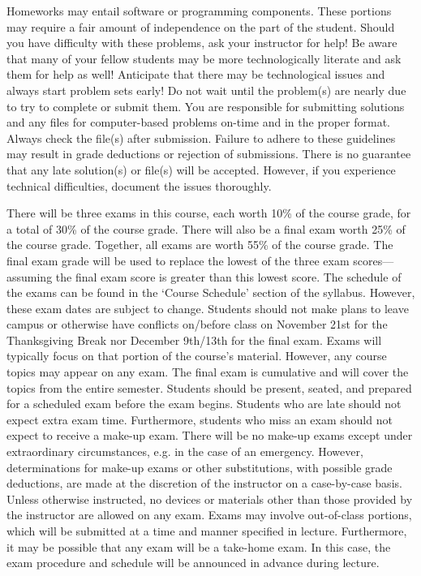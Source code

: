 \documentclass[11pt,letterpaper]{article}
\begin{document}
Homeworks may entail software or programming components. These portions may require a fair amount of independence on the part of the student. Should you have difficulty with these problems, ask your instructor for help! Be aware that many of your fellow students may be more technologically literate and ask them for help as well! Anticipate that there may be technological issues and always start problem sets early! Do not wait until the problem(s) are nearly due to try to complete or submit them. You are responsible for submitting solutions and any files for computer-based problems on-time and in the proper format. Always check the file(s) after submission. Failure to adhere to these guidelines may result in grade deductions or rejection of submissions. There is no guarantee that any late solution(s) or file(s) will be accepted. However, if you experience technical difficulties, document the issues thoroughly. 
\sectionbreak




There will be three exams in this course, each worth 10\% of the course grade, for a total of 30\% of the course grade. There will also be a final exam worth 25\% of the course grade. Together, all exams are worth 55\% of the course grade. The final exam grade will be used to replace the lowest of the three exam scores---assuming the final exam score is greater than this lowest score. The schedule of the exams can be found in the `Course Schedule' section of the syllabus. However, these exam dates are subject to change. Students should not make plans to leave campus or otherwise have conflicts on/before class on November 21st for the Thanksgiving Break nor December 9th/13th for the final exam. Exams will typically focus on that portion of the course's material. However, any course topics may appear on any exam. The final exam is cumulative and will cover the topics from the entire semester. Students should be present, seated, and prepared for a scheduled exam before the exam begins. Students who are late should not expect extra exam time. Furthermore, students who miss an exam should not expect to receive a make-up exam. There will be no make-up exams except under extraordinary circumstances, e.g. in the case of an emergency. However, determinations for make-up exams or other substitutions, with possible grade deductions, are made at the discretion of the instructor on a case-by-case basis. Unless otherwise instructed, no devices or materials other than those provided by the instructor are allowed on any exam. Exams may involve out-of-class portions, which will be submitted at a time and manner specified in lecture. Furthermore, it may be possible that any exam will be a take-home exam. In this case, the exam procedure and schedule will be announced in advance during lecture. 
\sectionbreak
\end{document}
